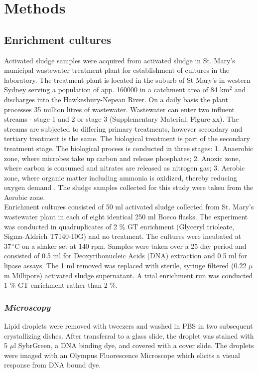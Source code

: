 \documentclass[twoside]{article}
\begin{document}
\section{Methods}
\thispagestyle{plain}
\subsection{Enrichment cultures}

Activated sludge samples were acquired from activated sludge in St. Mary’s municipal wastewater treat­ment plant for establishment of cultures in the laboratory. The treatment plant is located in the suburb of St Mary's in western Sydney serving a population of app. 160000 in a catchment area of 84 km$^{2}$ and discharges into the Hawkesbury-Nepean River. On a daily basis the plant processes 35 million litres of wastewater. Wastewater can enter two influent streams - stage 1 and 2 or stage 3 (Supplementary Material, Figure xx). The streams are subjected to differing primary treatments, however secondary and tertiary treatment is the same. The biological treatment is part of the secondary treatment stage. The biological process is conducted in three stages: 1. Anaerobic zone, where microbes take up carbon and release phosphates; 2. Anoxic zone, where carbon is consumed and nitrates are released as nitrogen gas; 3. Aerobic zone, where organic matter including ammonia is oxidized, thereby reducing oxygen demand \cite{stmarys}. The sludge samples collected for this study were taken from the Aerobic zone.\\


Enrichment cultures consisted of 50 ml activated sludge collected from St. Mary's wastewater plant in each of eight identical 250 ml Boeco flasks. The experiment was conducted in quadruplicates of 2 \% GT enrichment (Glyceryl trioleate, Sigma-Aldrich T7140-10G) and no treatment. The cultures were incubated at $37\,^{\circ}\mathrm{C}$ on a shaker set at 140 rpm. Samples were taken over a 25 day period and consisted of 0.5 ml for Deoxyribonucleic Acids (DNA) extraction and 0.5 ml for lipase assays. The 1 ml removed was replaced with sterile, syringe filtered (0.22 $\mu$m Millipore) activated sludge supernatant. 
A trial enrichment run was conducted 1 \% GT enrichment rather than 2 \%.

\subsubsection{\emph{Microscopy}}
Lipid droplets were removed with tweezers and washed in PBS in two subsequent crystallizing dishes. After transferral to a glass slide, the droplet was stained with 5 $\mu$l SybrGreen, a DNA binding dye, and covered with a cover slide. The droplets were imaged with an Olympus Fluorescence Microscope which elicits a visual response from DNA bound dye.
\end{document}
